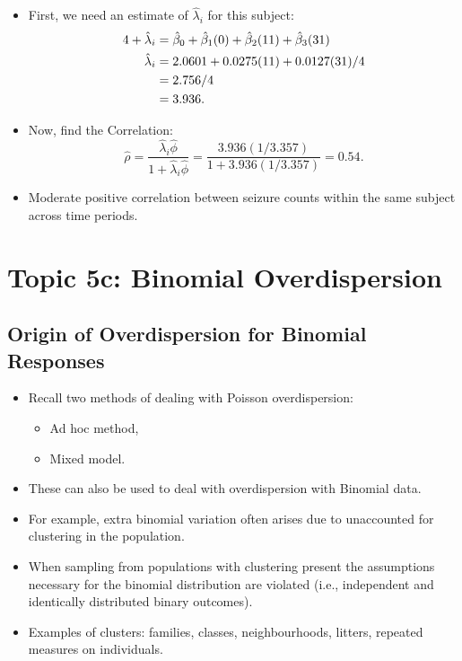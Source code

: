 \documentclass[oneside]{book}\usepackage[]{graphicx}\usepackage[svgnames]{xcolor}
\let\exp\relax%
\let\log\relax%
\begin{document}
\begin{itemize}
      \item First, we need an estimate of $ \hat{\lambda}_i $ for this subject:
            \begin{align*}
                  \log{4}+\log{\hat{\lambda}_i}
                                  & =\hat{\beta}_0+\hat{\beta}_1(0)+\hat{\beta}_2(11)+\hat{\beta}_3(31) \\
                  \hat{\lambda}_i & =\exp{2.0601+0.0275(11)+0.0127(31)}/4                               \\
                                  & =\exp{2.756}/4                                                      \\
                                  & =3.936.
            \end{align*}
      \item Now, find the Correlation:
            \[ \hat{\rho}=\frac{\hat{\lambda}_i\hat{\phi}}{1+\hat{\lambda}_i\hat{\phi}}=\frac{3.936(1/3.357)}{1+3.936(1/3.357)}=0.54. \]
      \item Moderate positive correlation between seizure counts within the same subject
            across time periods.
\end{itemize}

\section*{Topic 5c: Binomial Overdispersion}
\subsection*{Origin of Overdispersion for Binomial Responses}
\begin{itemize}
    \item Recall two methods of dealing with Poisson overdispersion:
          \begin{itemize}
              \item Ad hoc method,
              \item Mixed model.
          \end{itemize}
    \item These can also be used to deal with overdispersion with Binomial data.
    \item For example, extra binomial variation often arises due to unaccounted for
          clustering in the population.
    \item When sampling from populations with clustering present the assumptions
          necessary for the binomial distribution are violated (i.e., independent and
          identically distributed binary outcomes).
    \item Examples of clusters: families, classes, neighbourhoods, litters, repeated measures
          on individuals.
\end{itemize}
\end{document}
